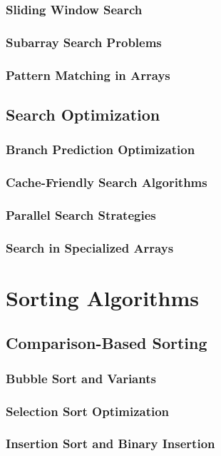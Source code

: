 \documentclass[12pt, oneside]{book}
\begin{document}
\subsubsection{Sliding Window Search}
\subsubsection{Subarray Search Problems}
\subsubsection{Pattern Matching in Arrays}

\subsection{Search Optimization}
\subsubsection{Branch Prediction Optimization}
\subsubsection{Cache-Friendly Search Algorithms}
\subsubsection{Parallel Search Strategies}
\subsubsection{Search in Specialized Arrays}

\section{Sorting Algorithms}
\subsection{Comparison-Based Sorting}
\subsubsection{Bubble Sort and Variants}
\subsubsection{Selection Sort Optimization}
\subsubsection{Insertion Sort and Binary Insertion}
\end{document}
